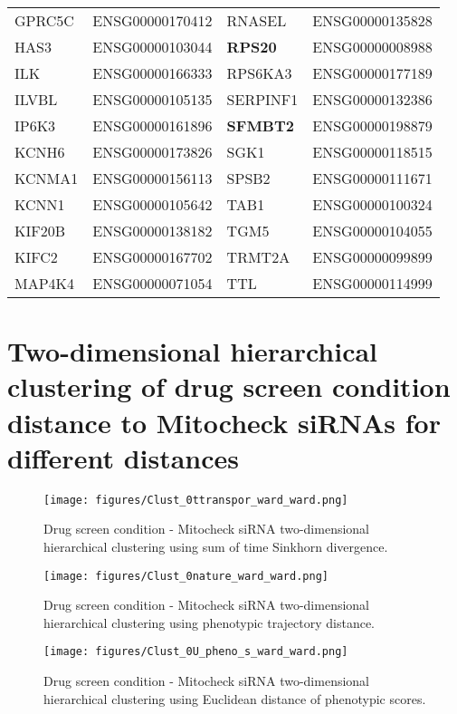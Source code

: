 \begin{table}[!ht]
\begin{tabular}{|l|l||l|l|}
GPRC5C  &  ENSG00000170412  &  RNASEL  &  ENSG00000135828  \\
HAS3  &  ENSG00000103044  &  \textbf{RPS20 } &  ENSG00000008988  \\
ILK  &  ENSG00000166333  &  RPS6KA3  &  ENSG00000177189  \\
ILVBL  &  ENSG00000105135  &  SERPINF1  &  ENSG00000132386  \\
IP6K3  &  ENSG00000161896  &  \textbf{SFMBT2}  &  ENSG00000198879  \\
KCNH6  &  ENSG00000173826  &  SGK1  &  ENSG00000118515  \\
KCNMA1  &  ENSG00000156113  &  SPSB2  &  ENSG00000111671  \\
KCNN1  &  ENSG00000105642  &  TAB1  &  ENSG00000100324  \\
KIF20B  &  ENSG00000138182  &  TGM5  &  ENSG00000104055  \\
KIFC2  &  ENSG00000167702  &  TRMT2A  &  ENSG00000099899  \\
MAP4K4  &  ENSG00000071054  &  TTL  &  ENSG00000114999  \\

\hline
\end{tabular}
\end{table}
\clearpage
\section{Two-dimensional hierarchical clustering of drug screen condition distance to Mitocheck siRNAs for different distances}
\label{heatmaps}

\begin{figure*}[ht!]
\centerline{\texttt{[image: figures/Clust\_0ttranspor\_ward\_ward.png]}
}
\caption{Drug screen condition - Mitocheck siRNA two-dimensional hierarchical clustering using sum of time Sinkhorn divergence.}
\label{cond_clust_ttransport}
\end{figure*}

\begin{figure*}[ht!]
\centerline{\texttt{[image: figures/Clust\_0nature\_ward\_ward.png]}
}
\caption{Drug screen condition - Mitocheck siRNA two-dimensional hierarchical clustering using phenotypic trajectory distance.}
\label{cond_clust_transport}
\end{figure*}

\begin{figure*}[ht!]
\centerline{\texttt{[image: figures/Clust\_0U\_pheno\_s\_ward\_ward.png]}
}
\caption{Drug screen condition - Mitocheck siRNA two-dimensional hierarchical clustering using Euclidean distance of phenotypic scores.}
\label{cond_clust_transport}
\end{figure*}



